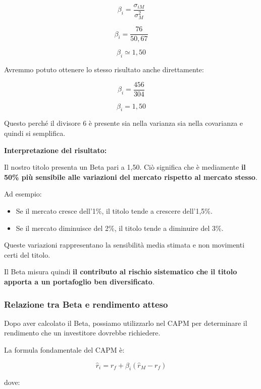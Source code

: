 \[
\beta_i=\frac{\sigma_{iM}}{\sigma_M^2}
\]

\[
\beta_i=\frac{76}{50{,}67}
\]

\[
\boxed{\beta_i\simeq1{,}50}
\]

\noindent Avremmo potuto ottenere
lo stesso risultato anche direttamente:

\[
\beta_i=\frac{456}{304}
\]

\[
\boxed{\beta_i=1{,}50}
\]

\noindent Questo perché il divisore 6
è presente sia nella varianza sia
nella covarianza e quindi si semplifica.

\medskip

\noindent \textbf{Interpretazione del risultato:}

\noindent Il nostro titolo presenta un Beta pari a 1,50.
Ciò significa che è mediamente
\textbf{il 50\% più sensibile alle variazioni
del mercato rispetto al mercato stesso}.

\medskip

\noindent Ad esempio:

\begin{itemize}
    \item Se il mercato cresce dell'1\%,
    il titolo tende a crescere dell'1,5\%.

    \item Se il mercato diminuisce del 2\%,
    il titolo tende a diminuire del 3\%.
\end{itemize}

\noindent Queste variazioni rappresentano
la sensibilità media stimata e non
movimenti certi del titolo.

\medskip

\noindent Il Beta misura quindi
\textbf{il contributo al rischio sistematico
che il titolo apporta a un portafoglio
ben diversificato}.


\subsubsection*{Relazione tra Beta e rendimento atteso}

\noindent Dopo aver calcolato il Beta,
possiamo utilizzarlo nel CAPM per determinare
il rendimento che un investitore dovrebbe richiedere.

\medskip

\noindent La formula fondamentale del CAPM è:

\[
\boxed{
\hat{r}_i=
r_f+\beta_i(\hat{r}_M-r_f)
}
\]

\noindent dove:

